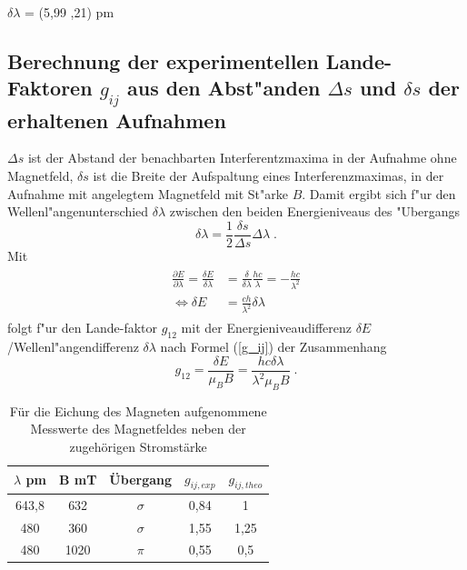 \begin{center}
$\delta \lambda$ = (5,99 ,21) pm
\end{center}


  \subsection{\texorpdfstring{Berechnung der experimentellen Lande-Faktoren $g_{ij}$ aus den Abst"anden $\Delta s$ und $\delta s$ der erhaltenen Aufnahmen}{Berechnung der experimentellen Lande-Faktoren g_{ij} aus den Abst"anden Delta s und delta s der erhaltenen Aufnahmen}}

  $\Delta s$ ist der Abstand der benachbarten Interferentzmaxima in der Aufnahme ohne Magnetfeld, $\delta s$ ist die Breite der Aufspaltung eines Interferenzmaximas, in der Aufnahme mit angelegtem Magnetfeld mit St"arke $B$.
  Damit ergibt sich f"ur den Wellenl"angenunterschied $\delta \lambda$ zwischen den beiden Energieniveaus des "Ubergangs
  \begin{equation}
    \delta \lambda = \frac{1}{2}\frac{\delta s}{\Delta s} \Delta \lambda \; .
  \end{equation}
  Mit
  \begin{align}
    \begin{split}
    \frac{\partial E}{\partial \lambda} = \frac{\delta E}{\delta \lambda} &= \frac{\delta}{\delta \lambda} \frac{hc}{\lambda} = -\frac{hc}{\lambda^2}\\
    \iff \delta E &= \frac{ch}{\lambda^2} \delta \lambda
   \end{split}
  \end{align}
  folgt f"ur den Lande-faktor $g_{12}$ mit der Energieniveaudifferenz $\delta E$/Wellenl"angendifferenz $\delta \lambda$ nach Formel (\ref{g_ij}) der Zusammenhang
  \begin{equation}
    g_{12}=\frac{\delta E}{\mu_BB}=\frac{hc\delta \lambda}{\lambda^2\mu_BB} \; .
  \end{equation}

          \begin{table}[H] 
	\centering
	\caption{Für die Eichung des Magneten aufgenommene Messwerte des Magnetfeldes neben der zugehörigen Stromstärke} 
	\begin{tabular}{c|c|c|c|c}

  $\lambda$ pm & B mT & Übergang & $g_{ij,exp}$& $g_{ij,theo}$\\
  \hline 
643,8 & 632 &$\sigma$&0,84&1\\
480 &360&$\sigma$&1,55&1,25\\
480 &1020 &$\pi$&0,55&0,5\\


		
	\end{tabular} 
	  \label{tab:mit6}
\end{table} 



















